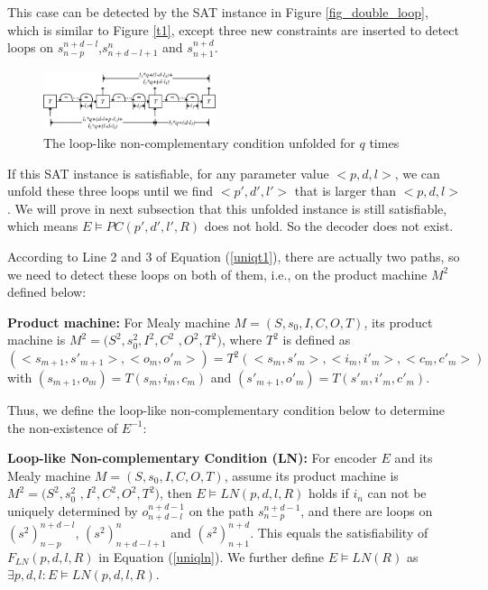 \documentclass{acm_proc_article-sp}
\begin{document}
This case can be detected by the SAT instance in Figure \ref{fig_double_loop},
which is similar to Figure \ref{t1},
except three new constraints are inserted to detect loops on $s_{n-p}^{n+d-l}$,$s_{n+d-l+1}^n$ and $s_{n+1}^{n+d}$.


\begin{figure}[t]
\begin{center}
\includegraphics[width=0.45\textwidth]{doubleloop_unfold}
\end{center}
\caption{The loop-like non-complementary condition unfolded for $q$ times}
  \label{fig_double_loop_unfold}
\end{figure}

If this SAT instance is satisfiable,
for any parameter value $<p,d,l>$,
we can unfold these three loops until we find $<p',d',l'>$ that is larger than $<p,d,l>$.
We will prove in next subsection that this unfolded instance is still satisfiable,
which means $E\vDash PC(p',d',l',R)$ does not hold.
So the decoder does not exist.

According to Line 2 and 3 of Equation (\ref{uniqt1}),
there are actually two paths,
so we need to detect these loops on both of them,
i.e.,
on the product machine $M^2$ defined below:

\begin{definition11}%
\textbf{Product machine:} For Mealy machine $M=(S,s_0,I,C,O,T)$,
its product machine is $M^2=(S^2,s_0^2,I^2,C^2$ $,O^2,T^2)$,
where
$T^2$ is defined as $(<s_{m+1},s'_{m+1}>,<o_m,o'_m>)=T^2(<s_m,s'_m>,<i_m,i'_m>,<c_m,c'_m>)$ with $(s_{m+1},o_m)=T(s_m,i_m,c_m)$ and $(s'_{m+1},o'_m)=T(s'_m,i'_m,c'_m)$.
\end{definition11}

Thus,
we define the loop-like non-complementary condition below to determine the non-existence of $E^{-1}$:

\begin{definition11}\label{def_lnc}%
\textbf{Loop-like Non-complementary Condition (LN):} For encoder $E$ and its Mealy machine $M=(S,s_0,I,C,O,T)$,
assume its product machine is $M^2=(S^2,s_0^2$ $,I^2,C^2,O^2,T^2)$,
then $E\vDash LN(p,d,l,R)$ holds if
$i_n$ can not be uniquely determined by $o_{n+d-l}^{n+d-1}$ on the path $s_{n-p}^{n+d-1}$,
and there are loops on $(s^2)_{n-p}^{n+d-l}$, $(s^2)_{n+d-l+1}^n$ and $(s^2)_{n+1}^{n+d}$.
This equals the satisfiability of $F_{LN}(p,d,l,R)$ in Equation (\ref{uniqln}).
We further define $E\vDash LN(R)$ as $\exists p,d,l:E\vDash LN(p,d,l,R)$.
\end{definition11}
\end{document}
